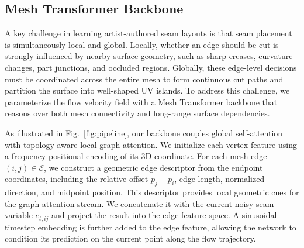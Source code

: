 
\subsection{Mesh Transformer Backbone}
\label{sec:backbone}
A key challenge in learning artist-authored seam layouts is that seam placement is simultaneously local and global. Locally, whether an edge should be cut is strongly influenced by nearby surface geometry, such as sharp creases, curvature changes, part junctions, and occluded regions. Globally, these edge-level decisions must be coordinated across the entire mesh to form continuous cut paths and partition the surface into well-shaped UV islands. To address this challenge, we parameterize the flow velocity field with a Mesh Transformer backbone that reasons over both mesh connectivity and long-range surface dependencies.

As illustrated in Fig.~\ref{fig:pipeline}, our backbone couples global self-attention with topology-aware local graph attention. We initialize each vertex feature using a frequency positional encoding of its 3D coordinate. 
For each mesh edge $(i,j)\in\mathcal{E}$, we construct a geometric edge descriptor from the endpoint coordinates, including the relative offset $p_j-p_i$, edge length, normalized direction, and midpoint position. 
This descriptor provides local geometric cues for the graph-attention stream.
We concatenate it with the current noisy seam variable $e_{t,ij}$ and project the result into the edge feature space. A sinusoidal timestep embedding is further added to the edge feature, allowing the network to condition its prediction on the current point along the flow trajectory.

